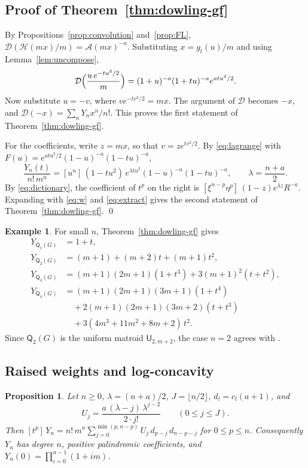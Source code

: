 \documentclass[11pt]{amsart}
\newtheorem{proposition}[theorem]{Proposition}
\theoremstyle{definition}
\newtheorem{example}[theorem]{Example}
\theoremstyle{remark}
\numberwithin{equation}{section}
\newcommand{\Q}{\mathsf{Q}}
\newcommand{\U}{\mathsf{U}}
\begin{document}
\subsection{Proof of Theorem~\ref{thm:dowling-gf}}
By Propositions~\ref{prop:convolution} and~\ref{prop:FL}, $\mathcal{D}(\mathcal{H}(mx)/m)=\mathcal{A}(mx)^{-a}$. Substituting $x=g_t(u)/m$ and using Lemma~\ref{lem:uncompose},
\[
\mathcal{D}\Bigl(\frac{u\,e^{-tu^2/2}}{m}\Bigr)=(1+u)^{-a}(1+tu)^{-a}e^{atu^2/2}.
\]
Now substitute $u=-v$, where $ve^{-tv^2/2}=mx$. The argument of $\mathcal{D}$ becomes $-x$, and $\mathcal{D}(-x)=\sum_nY_nx^n/n!$. This proves the first statement of Theorem~\ref{thm:dowling-gf}.

For the coefficients, write $z=mx$, so that $v=ze^{tv^2/2}$. By \eqref{eq:lagrange} with $F(u)=e^{atu^2/2}(1-u)^{-a}(1-tu)^{-a}$,
\begin{equation}\label{eq:Yn-u}
\frac{Y_n(t)}{n!\,m^n}=[u^n]\,(1-tu^2)\,e^{\lambda tu^2}(1-u)^{-a}(1-tu)^{-a},\qquad\lambda=\frac{n+a}{2}.
\end{equation}
By \eqref{eq:dictionary}, the coefficient of $t^p$ on the right is $[\xi^{n-p}\eta^p]\,(1-z)e^{\lambda z}R^{-a}$. Expanding with \eqref{eq:w} and \eqref{eq:extract} gives the second statement of Theorem~\ref{thm:dowling-gf}. \qed

\begin{example}\label{ex:small}
For small $n$, Theorem~\ref{thm:dowling-gf} gives
\begin{align*}
Y_{\Q_1(G)}&=1+t,\\
Y_{\Q_2(G)}&=(m+1)+(m+2)t+(m+1)t^2,\\
Y_{\Q_3(G)}&=(m+1)(2m+1)(1+t^3)+3(m+1)^2(t+t^2),\\
Y_{\Q_4(G)}&=(m+1)(2m+1)(3m+1)(1+t^4)\\
&\quad+2(m+1)(2m+1)(3m+2)(t+t^3)\\
&\quad+3(4m^3+11m^2+8m+2)\,t^2.
\end{align*}
Since $\Q_2(G)$ is the uniform matroid $\U_{2,m+2}$, the case $n=2$ agrees with \cite[Theorem~1.1]{GRX25}.
\end{example}

\subsection{Raised weights and log-concavity}

\begin{proposition}\label{prop:dowling-weights}
Let $n\ge0$, $\lambda=(n+a)/2$, $J=\lfloor n/2\rfloor$, $d_l=c_l(a+1)$, and
\begin{equation}\label{eq:U}
U_j=\frac{a\,(\lambda-j)\,\lambda^{j-2}}{2\cdot j!}\qquad(0\le j\le J).
\end{equation}
Then $[t^p]\,Y_n=n!\,m^n\sum_{j=0}^{\min(p,n-p)}U_j\,d_{p-j}\,d_{n-p-j}$ for $0\le p\le n$. Consequently $Y_n$ has degree $n$, positive palindromic coefficients, and $Y_n(0)=\prod_{i=0}^{n-1}(1+im)$.
\end{proposition}
\end{document}
